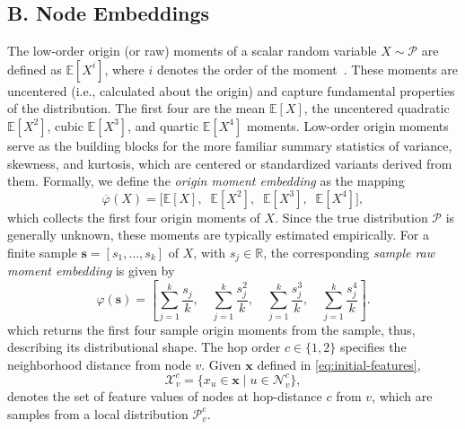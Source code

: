 \documentclass[
  reprint,
  superscriptaddress,
  amsmath,amssymb,
  aps,prl,
]{revtex4-2}
\begin{document}
%
%
%
\subsection{B. Node Embeddings}
%
%
%
\noindent The low-order origin (or raw) moments of a scalar random variable \( X \sim \mathcal{P} \) are defined as \(\mathbb{E}[X^i]\), where \(i\) denotes the order of the moment~\cite{shao1999mathematical}. These moments are uncentered (i.e., calculated about the origin) and capture fundamental properties of the distribution. The first four are the mean \(\mathbb{E}[X]\), the uncentered quadratic \(\mathbb{E}[X^2]\), cubic \(\mathbb{E}[X^3]\), and quartic \(\mathbb{E}[X^4]\) moments. Low-order origin moments serve as the building blocks for the more familiar summary statistics of variance, skewness, and kurtosis, which are centered or standardized variants derived from them.
%
Formally, we define the \emph{origin moment embedding} as the mapping
\begin{equation}
\overline{\varphi}(X) = \bigl[ \mathbb{E}[X], \;\; \mathbb{E}[X^2], \;\; \mathbb{E}[X^3], \;\; \mathbb{E}[X^4] \bigr],
\end{equation}
which collects the first four origin moments of \(X\).
Since the true distribution \(\mathcal{P}\) is generally unknown, these moments are typically estimated empirically. For a finite sample \(\boldsymbol s = [s_1, \ldots, s_k]\) of \(X\), with \(s_j \in \mathbb R\), the corresponding \emph{sample raw moment embedding} is given by
\begin{equation}
\varphi(\boldsymbol s) = \left[
\sum_{j=1}^k \frac{s_j}{k}, \quad
\sum_{j=1}^k \frac{s_j^2}{k}, \quad
\sum_{j=1}^k \frac{s_j^3}{k}, \quad
\sum_{j=1}^k \frac{s_j^4}{k}
\right].
\label{eq:sample-raw-moment-embedding}
\end{equation}
which returns the first four sample origin moments from the sample, thus, describing its distributional shape.
%
The hop order \(c \in \{1,2\}\) specifies the neighborhood distance from node \(v\). Given \(\boldsymbol{x}\) defined in \cref{eq:initial-features},
\begin{equation}
\mathcal{X}^c_v = \{ x_u \in \boldsymbol{x} \mid u \in \mathcal{N}^c_v \},
\end{equation}
\noindent denotes the set of feature values of nodes at hop-distance \(c\) from \(v\), which are samples from a local distribution \(\mathcal P_v^c\).
\end{document}

